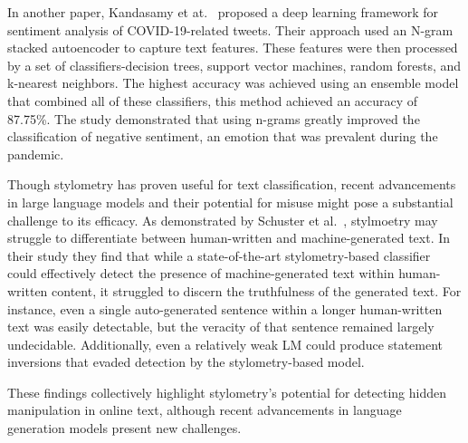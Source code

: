 \documentclass[twoside]{ctuthesis}
\theoremstyle{plain}
\theoremstyle{definition}
\theoremstyle{note}
\begin{document}
In another paper, Kandasamy et at.~\cite{Kandasamy2021COVID} proposed a deep learning framework for sentiment analysis of COVID-19-related tweets. Their approach used an N-gram stacked autoencoder to capture text features. These features were then processed by a set of classifiers-decision trees, support vector machines, random forests, and k-nearest neighbors. The highest accuracy was achieved using an ensemble model that combined all of these classifiers, this method achieved an accuracy of 87.75\%. The study demonstrated that using n-grams greatly improved the classification of negative sentiment, an emotion that was prevalent during the pandemic.\par

Though stylometry has proven useful for text classification, recent advancements in large language models and their potential for misuse might pose a substantial challenge to its efficacy. As demonstrated by Schuster et al.~\cite{Schuster2020}, stylmoetry may struggle to differentiate between human-written and machine-generated text. In their study they find that while a state-of-the-art stylometry-based classifier could effectively detect the presence of machine-generated text within human-written content, it struggled to discern the truthfulness of the generated text.  For instance, even a single auto-generated sentence within a longer human-written text was easily detectable, but the veracity of that sentence remained largely undecidable.  Additionally, even a relatively weak LM could produce statement inversions that evaded detection by the stylometry-based model.\par

These findings collectively highlight stylometry's potential for detecting hidden manipulation in online text, although recent advancements in language generation models present new challenges.\par
\end{document}
